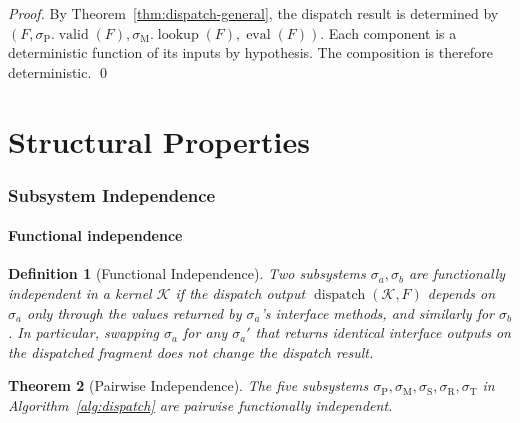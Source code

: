 \documentclass[twocolumn,11pt,a4paper]{article}
\newtheorem{theorem}{Theorem}[section]
\newtheorem{definition}[theorem]{Definition}
\DeclareMathOperator{\dispatch}{dispatch}
\DeclareMathOperator{\eval}{eval}
\DeclareMathOperator{\valid}{valid}
\DeclareMathOperator{\lookup}{lookup}
\newcommand{\Kernel}{\mathcal{K}}
\newcommand{\Frag}{F}
\newcommand{\Sub}{\sigma}
\newcommand{\Pve}{\Sub_{\mathrm{P}}}
\newcommand{\Cmm}{\Sub_{\mathrm{M}}}
\newcommand{\Pss}{\Sub_{\mathrm{S}}}
\newcommand{\Dic}{\Sub_{\mathrm{R}}}
\newcommand{\Tem}{\Sub_{\mathrm{T}}}
\begin{document}
\begin{proof}
By Theorem~\ref{thm:dispatch-general}, the dispatch result is determined by $(\Frag, \Pve.\valid(\Frag), \Cmm.\lookup(\Frag), \eval(\Frag))$. Each component is a deterministic function of its inputs by hypothesis. The composition is therefore deterministic. \qed
\end{proof}

\part{Structural Properties}

\section{Subsystem Independence}
\label{sec:independence}

\subsection{Functional independence}

\begin{definition}[Functional Independence]
\label{def:functional-independence}
Two subsystems $\Sub_a, \Sub_b$ are \emph{functionally independent} in a kernel $\Kernel$ if the dispatch output $\dispatch(\Kernel, \Frag)$ depends on $\Sub_a$ only through the values returned by $\Sub_a$'s interface methods, and similarly for $\Sub_b$. In particular, swapping $\Sub_a$ for any $\Sub_a'$ that returns identical interface outputs on the dispatched fragment does not change the dispatch result.
\end{definition}

\begin{theorem}[Pairwise Independence]
\label{thm:independence}
The five subsystems $\Pve, \Cmm, \Pss, \Dic, \Tem$ in Algorithm~\ref{alg:dispatch} are pairwise functionally independent.
\end{theorem}
\end{document}
